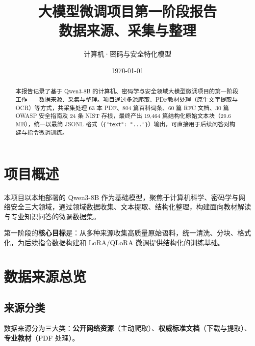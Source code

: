 \documentclass[12pt,a4paper]{ctexart}
\title{\textbf{大模型微调项目第一阶段报告}\\[4pt]
       \large 数据来源、采集与整理}
\author{计算机·密码与安全特化模型}
\date{\today}
\begin{document}
\maketitle
\thispagestyle{empty}

\begin{abstract}
\noindent 本报告记录了基于 Qwen3-8B 的计算机、密码学与安全领域大模型微调项目的第一阶段工作——数据来源、采集与整理。项目通过多源爬取、PDF教材处理（原生文字提取与OCR）等方式，共采集处理 63 本 PDF、804 篇百科词条、60 篇 RFC 文档、30 篇 OWASP 安全指南及 24 条 NIST 存根，最终产出 19,464 篇结构化原始文本块（29.6 MB），统一以最简 JSONL 格式（\texttt{\{"text": "..."\}}）输出，可直接用于后续问答对构建与指令微调训练。
\end{abstract}

\section{项目概述}

本项目以本地部署的 Qwen3-8B 作为基础模型，聚焦于计算机科学、密码学与网络安全三大领域，通过领域数据收集、文本提取、结构化整理，构建面向教材解读与专业知识问答的微调数据集。

第一阶段的\textbf{核心目标}是：从多种来源收集高质量原始语料，统一清洗、分块、格式化，为后续指令数据构建和 LoRA/QLoRA 微调提供结构化的训练基础。

\section{数据来源总览}

\subsection{来源分类}

数据来源分为三大类：\textbf{公开网络资源}（主动爬取）、\textbf{权威标准文档}（下载与提取）、\textbf{专业教材}（PDF 处理）。
\end{document}
